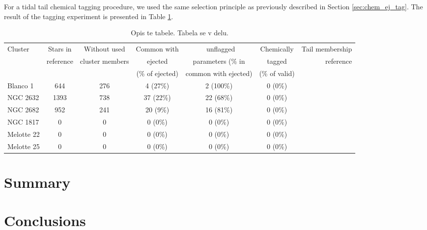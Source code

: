 For a tidal tail chemical tagging procedure, we used the same selection principle as previously described in Section \ref{sec:chem_ej_tag}. The result of the tagging experiment is presented in Table \ref{tab:cluster_stats_tails}.

\begin{table}
	\centering
	\caption{Opis te tabele. Tabela se v delu.}
	\begin{tabular}{l | c | c | c | c | c | r }
		\hline
		Cluster & Stars in & Without used & Common with & \Gh\ unflagged & Chemically & Tail membership\\
		 & reference & cluster members & ejected & parameters (\% in & tagged & reference\\
		 &  &  & (\% of ejected) & common with ejected) & (\% of valid) & \\
		\hline
		Blanco 1     & 644 & 276 & 4 (27\%) & 2 (100\%) & 0 (0\%) & \citet{2019arXiv191206657Z} \\
		NGC 2632  & 1393 & 738 & 37 (22\%) & 22 (68\%) & 0 (0\%) & \citet{2019AA...627A...4R} \\
		NGC 2682     & 952 & 241 & 20 (9\%) & 16 (81\%) & 0 (0\%) & \citet{2019AA...627A.119C} \\
		NGC 1817     & 0 & 0 & 0 (0\%) & 0 (0\%) & 0 (0\%) & \citet{a} \\
		Melotte 22   & 0 & 0 & 0 (0\%) & 0 (0\%) & 0 (0\%) & \citet{a} \\
		Melotte 25   & 0 & 0 & 0 (0\%) & 0 (0\%) & 0 (0\%) & \citet{2019AA...621L...3M} \\
		\hline
	\end{tabular}
	\label{tab:cluster_stats_tails}
\end{table}

\section{Summary}
\label{sec:clusters_summary}

\section{Conclusions}
\label{sec:clusters_conclusions}
